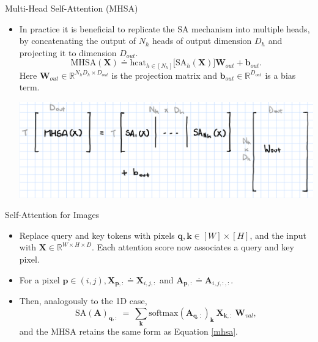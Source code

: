 \documentclass[9pt]{beamer}
\newcommand{\bb}{\mathbb}
\newcommand{\mb}{\bm}
\begin{document}
\begin{frame}{Multi-Head Self-Attention (MHSA)}
\begin{itemize}
\item In practice it is beneficial to replicate the SA mechanism into multiple heads, by concatenating the output of $N_h$ heads of output dimension $D_h$ and projecting it to dimension $D_{out}$.
\begin{equation}
\mathrm{MHSA}(\mb X) \doteq \mathrm{hcat}_{h\in[N_h]}\big[\mathrm{SA}_h(\mb X)\big]\mb W_{out} + \mb b_{out}. \label{mhsa}
\end{equation}
Here $\bm W_{out}\in\bb R^{N_hD_h\times D_{out}}$ is the projection matrix and $\bm  b_{out}\in\bb R^{D_{out}}$ is a bias term.

\vspace{.2in}
\begin{center}
    \includegraphics[width=.7\textwidth]{images/mhsa.PNG}
\end{center}
\end{itemize}
\end{frame}


\begin{frame}{Self-Attention for Images}
\begin{itemize}
\item Replace query and key tokens with pixels $\bm q, \bm k \in [W]\times[H]$, and the input with $\bm X \in \bb R^{W\times H\times D}$. Each attention score now associates a query and key pixel. 

\item For a pixel $\bm p\in (i,j), \bm X_{\bm p,:} \doteq \bm X_{i,j,:}$ and $\bm A_{\bm p, :} \doteq \bm A_{i,j,:,:}$. 

\item Then, analogously to the 1D case,
\begin{equation}
\mathrm{SA}(\mb A)_{\mb q, :} \ = \ \sum_{\mb k} \mathrm{softmax}(\mb A_{\mb q, :})_{\mb k}\ \mb X_{\mb k, :} \ \mb W_{val},
\end{equation}
and the MHSA retains the same form as Equation \eqref{mhsa}.
\end{itemize}
\end{frame}
\end{document}
